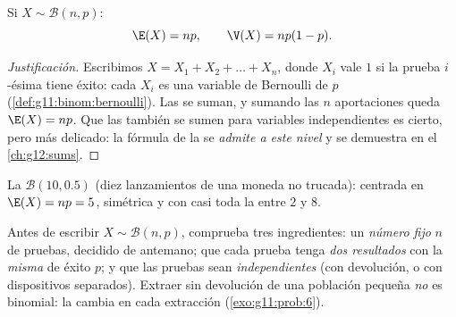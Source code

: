 \begin{proposition}\label{prop:g11:binom:expectation}
Si $X \sim \mathcal B(n, p)$:
\[
\E(X) = np,
\qquad
\V(X) = np(1-p).
\]
\end{proposition}

\begin{proof}[Justificación]
Escribimos $X = X_1 + X_2 + \dots + X_n$, donde $X_i$ vale $1$ si la
prueba $i$-ésima tiene éxito: cada $X_i$ es una variable de Bernoulli de
 $p$ (\cref{def:g11:binom:bernoulli}). Las  se suman, y
sumando las $n$ aportaciones queda $\E(X) = np$. Que las
\emph{} también se sumen para variables independientes es cierto,
pero más delicado: la fórmula de la  se \emph{admite a este
nivel} y se demuestra en el \cref{ch:g12:sums}.
\end{proof}

\begin{omfigure}

{\small La  $\mathcal B(10, 0.5)$ (diez lanzamientos de una
moneda no trucada): centrada en $\E(X) = np = 5$, simétrica y con casi
toda la  entre $2$ y $8$.}
\end{omfigure}

\begin{method}\label{met:g11:binom:recognize}
Antes de escribir $X \sim \mathcal B(n, p)$, comprueba tres ingredientes:
un \emph{número fijo} $n$ de pruebas, decidido de antemano; que cada
prueba tenga \emph{dos resultados} con la \emph{misma}  de
éxito $p$; y que las pruebas sean \emph{independientes} (con devolución, o
con dispositivos separados). Extraer sin devolución de una población
pequeña \emph{no} es binomial: la  cambia en cada extracción
(\cref{exo:g11:prob:6}).
\end{method}

